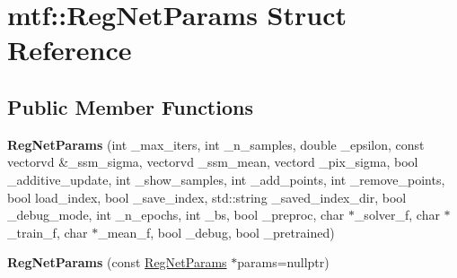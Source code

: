 \hypertarget{structmtf_1_1RegNetParams}{\section{mtf\-:\-:Reg\-Net\-Params Struct Reference}
\label{structmtf_1_1RegNetParams}
}
\subsection*{Public Member Functions}
\begin{DoxyCompactItemize}
\item 
\hypertarget{structmtf_1_1RegNetParams_a565b42978cc18f731b785dd0281b7d45}{{\bfseries Reg\-Net\-Params} (int \-\_\-max\-\_\-iters, int \-\_\-n\-\_\-samples, double \-\_\-epsilon, const vectorvd \&\-\_\-ssm\-\_\-sigma, vectorvd \-\_\-ssm\-\_\-mean, vectord \-\_\-pix\-\_\-sigma, bool \-\_\-additive\-\_\-update, int \-\_\-show\-\_\-samples, int \-\_\-add\-\_\-points, int \-\_\-remove\-\_\-points, bool load\-\_\-index, bool \-\_\-save\-\_\-index, std\-::string \-\_\-saved\-\_\-index\-\_\-dir, bool \-\_\-debug\-\_\-mode, int \-\_\-n\-\_\-epochs, int \-\_\-bs, bool \-\_\-preproc, char $\ast$\-\_\-solver\-\_\-f, char $\ast$\-\_\-train\-\_\-f, char $\ast$\-\_\-mean\-\_\-f, bool \-\_\-debug, bool \-\_\-pretrained)}\label{structmtf_1_1RegNetParams_a565b42978cc18f731b785dd0281b7d45}

\item 
\hypertarget{structmtf_1_1RegNetParams_a4d16525281dbebca8709845b2bea0985}{{\bfseries Reg\-Net\-Params} (const \hyperlink{structmtf_1_1RegNetParams}{Reg\-Net\-Params} $\ast$params=nullptr)}\label{structmtf_1_1RegNetParams_a4d16525281dbebca8709845b2bea0985}

\end{DoxyCompactItemize}
